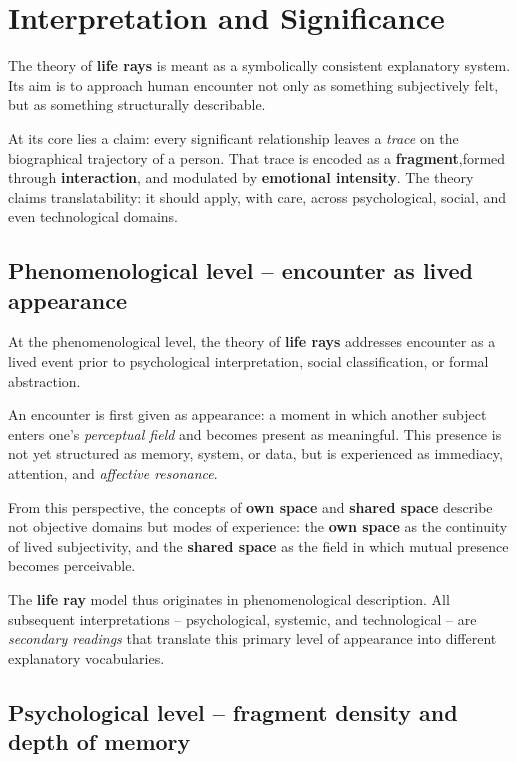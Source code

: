 \section{Interpretation and Significance}

The theory of \textbf{life rays} is meant as a symbolically consistent explanatory system.
Its aim is to approach human encounter
not only as something subjectively felt,
but as something structurally describable.

At its core lies a claim: every significant relationship leaves a \textit{trace} on the biographical trajectory of a person.
That trace is encoded as a \textbf{fragment},formed through \textbf{interaction}, and modulated by \textbf{emotional intensity}.
The theory claims translatability: it should apply, with care, across psychological, social, and even technological domains.

\subsection{Phenomenological level -- encounter as lived appearance}

At the phenomenological level, the theory of \textbf{life rays} addresses encounter
as a lived event prior to psychological interpretation, social classification,
or formal abstraction.

An encounter is first given as appearance: a moment in which another
subject enters one’s \textit{perceptual field} and becomes present as meaningful.
This presence is not yet structured as memory, system, or data,
but is experienced as immediacy, attention, and \textit{affective resonance}.

From this perspective, the concepts of \textbf{own space} and \textbf{shared space}
describe not objective domains but modes of experience:
the \textbf{own space} as the continuity of lived subjectivity,
and the \textbf{shared space} as the field in which mutual presence becomes perceivable.

The \textbf{life ray} model thus originates in phenomenological description.
All subsequent interpretations -- psychological, systemic, and technological --
are \textit{secondary readings} that translate this primary level of appearance
into different explanatory vocabularies.


\subsection{Psychological level -- fragment density and depth of memory}

